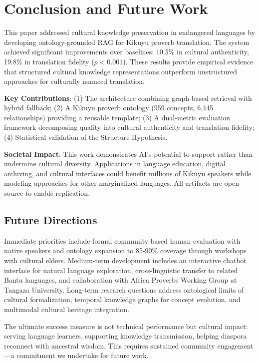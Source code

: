 
\section{Conclusion and Future Work}
\label{sec:conclusion}

This paper addressed cultural knowledge preservation in endangered languages by developing ontology-grounded RAG for Kikuyu proverb translation. The \thillmo{} system achieved significant improvements over baselines: 10.5\% in cultural authenticity, 19.8\% in translation fidelity ($p<0.001$). These results provide empirical evidence that structured cultural knowledge representations outperform unstructured approaches for culturally nuanced translation.

\textbf{Key Contributions}: (1) The \ograg{} architecture combining graph-based retrieval with hybrid fallback; (2) A Kikuyu proverb ontology (959 concepts, 6,445 relationships) providing a reusable template; (3) A dual-metric evaluation framework decomposing quality into cultural authenticity and translation fidelity; (4) Statistical validation of the Structure Hypothesis.

\textbf{Societal Impact}: This work demonstrates AI's potential to support rather than undermine cultural diversity. Applications in language education, digital archiving, and cultural interfaces could benefit millions of Kikuyu speakers while modeling approaches for other marginalized languages. All artifacts are open-source to enable replication.

\subsection{Future Directions}

Immediate priorities include formal community-based human evaluation with native speakers and ontology expansion to 85-90\% coverage through workshops with cultural elders. Medium-term development includes an interactive chatbot interface for natural language exploration, cross-linguistic transfer to related Bantu languages, and collaboration with Africa Proverbs Working Group at Tangaza University. Long-term research questions address ontological limits of cultural formalization, temporal knowledge graphs for concept evolution, and multimodal cultural heritage integration.

The ultimate success measure is not technical performance but cultural impact: serving language learners, supporting knowledge transmission, helping diaspora reconnect with ancestral wisdom. This requires sustained community engagement---a commitment we undertake for future work.

